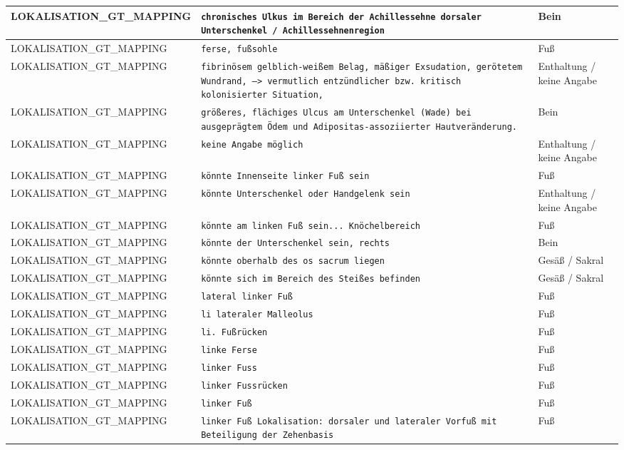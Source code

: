 \begin{longtable}{|p{3.5cm}|p{5cm}|p{6.5cm}|}
LOKALISATION\_GT\_MAPPING & \texttt{chronisches Ulkus im Bereich der Achillessehne
dorsaler Unterschenkel / Achillessehnenregion} & Bein \\ \hline
LOKALISATION\_GT\_MAPPING & \texttt{ferse, fußsohle} & Fuß \\ \hline
LOKALISATION\_GT\_MAPPING & \texttt{fibrinösem gelblich-weißem Belag,
mäßiger Exsudation,
gerötetem Wundrand,
--> vermutlich entzündlicher bzw. kritisch kolonisierter Situation,} & Enthaltung / keine Angabe \\ \hline
LOKALISATION\_GT\_MAPPING & \texttt{größeres, flächiges Ulcus am Unterschenkel (Wade) bei ausgeprägtem Ödem und Adipositas-assoziierter Hautveränderung.} & Bein \\ \hline
LOKALISATION\_GT\_MAPPING & \texttt{keine Angabe möglich} & Enthaltung / keine Angabe \\ \hline
LOKALISATION\_GT\_MAPPING & \texttt{könnte Innenseite linker Fuß sein} & Fuß \\ \hline
LOKALISATION\_GT\_MAPPING & \texttt{könnte Unterschenkel oder Handgelenk sein} & Enthaltung / keine Angabe \\ \hline
LOKALISATION\_GT\_MAPPING & \texttt{könnte am linken Fuß sein... Knöchelbereich} & Fuß \\ \hline
LOKALISATION\_GT\_MAPPING & \texttt{könnte der Unterschenkel sein, rechts} & Bein \\ \hline
LOKALISATION\_GT\_MAPPING & \texttt{könnte oberhalb des os sacrum liegen} & Gesäß / Sakral \\ \hline
LOKALISATION\_GT\_MAPPING & \texttt{könnte sich im Bereich des Steißes befinden} & Gesäß / Sakral \\ \hline
LOKALISATION\_GT\_MAPPING & \texttt{lateral linker Fuß} & Fuß \\ \hline
LOKALISATION\_GT\_MAPPING & \texttt{li lateraler Malleolus} & Fuß \\ \hline
LOKALISATION\_GT\_MAPPING & \texttt{li. Fußrücken} & Fuß \\ \hline
LOKALISATION\_GT\_MAPPING & \texttt{linke Ferse} & Fuß \\ \hline
LOKALISATION\_GT\_MAPPING & \texttt{linker Fuss} & Fuß \\ \hline
LOKALISATION\_GT\_MAPPING & \texttt{linker Fussrücken} & Fuß \\ \hline
LOKALISATION\_GT\_MAPPING & \texttt{linker Fuß} & Fuß \\ \hline
LOKALISATION\_GT\_MAPPING & \texttt{linker Fuß
Lokalisation: dorsaler und lateraler Vorfuß mit Beteiligung der Zehenbasis} & Fuß \\ \hline

\end{longtable}
